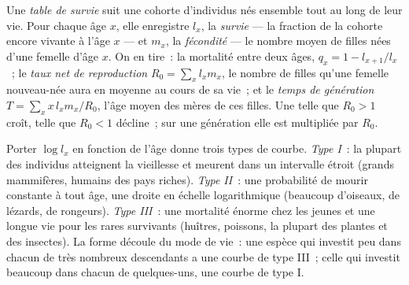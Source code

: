 \begin{definition}\label{def:b1:populations:lifetable}
Une \emph{table de survie} suit une cohorte d'individus nés ensemble
tout au long de leur vie. Pour chaque âge $x$, elle enregistre $l_x$,
la \emph{survie} --- la fraction de la cohorte encore vivante à l'âge
$x$ --- et $m_x$, la \emph{fécondité} --- le nombre moyen de filles nées
d'une femelle d'âge $x$. On en tire~: la mortalité entre deux âges,
$q_x = 1 - l_{x+1}/l_x$~; le \emph{taux net de reproduction}
$R_0 = \sum_x l_x m_x$, le nombre de filles qu'une femelle nouveau-née
aura en moyenne au cours de sa vie~; et le \emph{temps de génération}
$T = \sum_x x\,l_x m_x / R_0$, l'âge moyen des mères de ces filles. Une
 telle que $R_0 > 1$ croît, telle que $R_0 < 1$ décline~; sur
une génération elle est multipliée par $R_0$.
\end{definition}

\begin{proposition}\label{prop:b1:populations:survivorship}
Porter $\log l_x$ en fonction de l'âge donne trois types de courbe.
\emph{Type I}~: la plupart des individus atteignent la vieillesse et
meurent dans un intervalle étroit (grands mammifères, humains des pays
riches). \emph{Type II}~: une probabilité de mourir constante à tout
âge, une droite en échelle logarithmique (beaucoup d'oiseaux, de
lézards, de rongeurs). \emph{Type III}~: une mortalité énorme chez les
jeunes et une longue vie pour les rares survivants (huîtres, poissons,
la plupart des plantes et des insectes). La forme découle du mode de
vie~: une espèce qui investit peu dans chacun de très nombreux
descendants a une courbe de type III~; celle qui investit beaucoup dans
chacun de quelques-uns, une courbe de type I.
\end{proposition}

